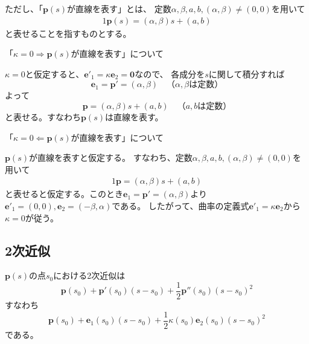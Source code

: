 \documentclass[a4j,disablejfam,dvipdfmx,papersize,slide,uplatex,21pt]{jsarticle}
\makeatletter
\renewenvironment{proof}[1][\proofname]{\par
        \pushQED{\qed}
        \normalfont
        \topsep6\p@\@plus6\p@ \trivlist
        \item[\hskip\labelsep{\bfseries #1}\@addpunct{\bfseries}]\ignorespaces
    }{%
        \popQED\endtrivlist\@endpefalse
    }
\renewcommand{\proofname}{証明.}
\makeatother
\begin{document}
ただし、「$\bm{p}(s)$が直線を表す」とは、
定数$\alpha, \beta, a, b, (\alpha, \beta) \neq (0, 0)$を用いて
\begin{alignat}{1}
    \bm{p}(s) = (\alpha, \beta) s + (a, b)
\end{alignat}
と表せることを指すものとする。

\newpage
\begin{proof}
    「$\kappa = 0 \Rightarrow \text{$\bm{p}(s)$が直線を表す}$」について

    $\kappa = 0$と仮定すると、$\bm{e}'_1 = \kappa \bm{e}_2 = \bm{0}$なので、
    各成分を$s$に関して積分すれば
    \begin{equation}
        \bm{e}_1 = \bm{p}' = (\alpha, \beta) \quad \text{（$\alpha, \beta$は定数）}
    \end{equation}
    よって
    \begin{equation}
        \bm{p} = (\alpha, \beta) s + (a, b) \quad \text{（$a, b$は定数）}
    \end{equation}
    と表せる。すなわち$\bm{p}(s)$は直線を表す。

    \newpage

    「$\kappa = 0 \Leftarrow \text{$\bm{p}(s)$が直線を表す}$」について

    $\bm{p}(s)$が直線を表すと仮定する。
    すなわち、定数$\alpha, \beta, a, b, (\alpha, \beta) \neq (0, 0)$を用いて
    \begin{alignat}{1}
        \bm{p} = (\alpha, \beta) s + (a, b)
    \end{alignat}
    と表せると仮定する。このとき$\bm{e}_1 = \bm{p}' = (\alpha, \beta)$より
    $\bm{e}'_1 = (0, 0), \bm{e}_2 = (-\beta, \alpha)$である。
    したがって、曲率の定義式$\bm{e}'_1 = \kappa \bm{e}_2$から
    $\kappa = 0$が従う。
\end{proof}

\newpage
\subsection*{2次近似}
$\bm{p}(s)$の点$s_0$における2次近似は
\begin{equation}
    \bm{p}(s_0) + \bm{p}'(s_0) (s - s_0) + \frac{1}{2} \bm{p}''(s_0) (s - s_0)^2
\end{equation}
すなわち
\begin{equation}
    \bm{p}(s_0) + \bm{e}_1(s_0) (s - s_0) + \frac{1}{2} \kappa(s_0) \bm{e}_2(s_0) (s - s_0)^2
\end{equation}
である。

\newpage
\end{document}
